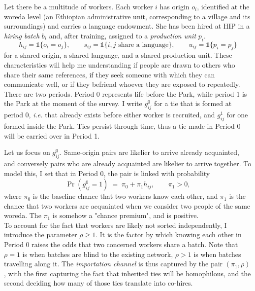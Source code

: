 \noindent Let there be a multitude of workers. Each worker $i$ has origin $o_i$, identified at the woreda level (an Ethiopian administrative unit, corresponding to a village and its surroundings) and carries a language endowment. She has been hired at HIP in a \textit{hiring batch} $b_i$ and, after training, assigned to a \textit{production unit} $p_i$. 
\[
h_{ij} = \mathds{1}\{o_i = o_j\}, \qquad
s_{ij} = \mathds{1}\{i,j \text{ share a language}\}, \qquad
u_{ij} = \mathds{1}\{p_i = p_j\}
\]
for a shared origin, a shared language, and a shared production unit. These characteristics will help me understanding if people are drawn to others who share their same references, if they seek someone with which they can communicate well, or if they befriend whoever they are exposed to repeatedly. \\

\noindent There are two periods. Period 0 represents life before the Park, while period 1 is the Park at the moment of the survey. I write $g^0_{ij}$ for a tie that is formed at period 0, \textit{i.e.} that already exists before either worker is recruited, and $g^1_{ij}$ for one formed inside the Park. Ties persist through time, thus a tie made in Period 0 will be carried over in Period 1. \\


\noindent Let us focus on $g^0_{ij}$. Same-origin pairs are likelier to arrive already acquainted, and conversely pairs who are already acquainted are likelier to arrive together. To model this, I set that in Period 0,  the pair is linked with probability
\begin{equation}
\label{eq:model-inherit}
\Pr(g^0_{ij}=1) \;=\; \pi_0 + \pi_1 h_{ij}, \qquad \pi_1 > 0,
\end{equation}
where $\pi_0$ is the baseline chance that two workers know each other, and $\pi_1$ is the chance that two workers are acquainted when we consider two people of the same woreda. The $\pi_1$ is somehow a "chance premium", and is positive.\\

\noindent To account for the fact that workers are likely not sorted independently, I introduce the parameter $\rho \geq 1$. It is the factor by which knowing each other in Period 0 raises the odds that two concerned workers share a batch. Note that $\rho = 1$ is when batches are blind to the existing network, $\rho > 1$ is when batches travelling along it. The \textit{importation channel} is thus captured by the pair $(\pi_1, \rho)$, with the first capturing the fact that inherited ties will be homophilous, and the second deciding how many of those ties translate into co-hires. \\

